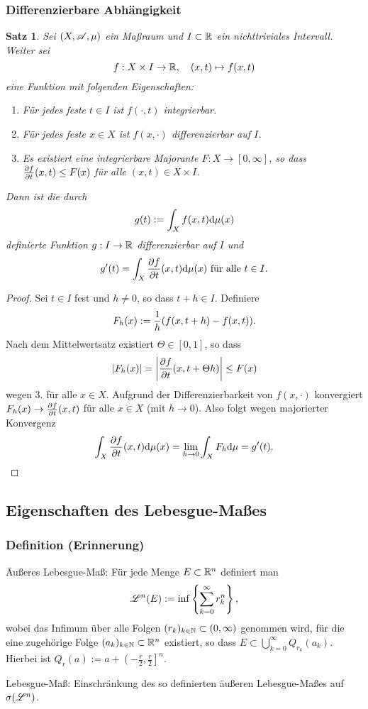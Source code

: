 \documentclass[
 a4paper,
 12pt,
 parskip=half
 ]{scrartcl}
\theoremstyle{plain}
\newtheorem*{thm*}{Satz}
\theoremstyle{definition}
\numberwithin{equation}{section}
\begin{document}
\subsubsection{Differenzierbare Abhängigkeit}
\begin{thm*}
 Sei $(X, \mathscr{A}, \mu)$ ein Maßraum und $I \subset \mathbb{R}$ ein nichttriviales Intervall. Weiter sei 
 \[ f: X \times I \to \mathbb{R}, \quad (x,t) \mapsto f(x,t) \]
 eine Funktion mit folgenden Eigenschaften:
 \begin{enumerate}
  \item Für jedes feste $t \in I$ ist $f( \cdot, t )$ integrierbar.
  \item Für jedes feste $x \in X$ ist $f( x, \cdot )$ differenzierbar auf $I$.
  \item Es existiert eine integrierbare Majorante $F: X \to [0,\infty]$, so dass $\frac{\partial f}{\partial t}(x,t) \le F(x)$ für alle $(x,t) \in X \times I$.
 \end{enumerate}
 Dann ist die durch
 \[ g(t) := \int_X f(x,t) \mathrm{d} \mu(x)  \]
 definierte Funktion $g: I \to \mathbb{R}$ differenzierbar auf $I$ und
 \[ g'(t) = \int_X \frac{\partial f}{\partial t}(x,t) \mathrm{d} \mu(x) \text{ für alle } t \in I. \]
\end{thm*}

\begin{proof}
 Sei $t \in I$ fest und $h \ne 0$, so dass $t+h \in I$. Definiere
 \[ F_h(x) := \frac{1}{h}( f(x, t+h) - f(x,t) ). \]
 Nach dem Mittelwertsatz existiert $\Theta \in [0,1]$, so dass
 \[ |F_h(x)| = \left| \frac{\partial f}{\partial t} (x, t + \Theta h) \right| \le F(x) \]
 wegen 3. für alle $x \in X$. Aufgrund der Differenzierbarkeit von $f(x, \cdot)$ konvergiert $F_h(x) \to \frac{\partial f}{\partial t}(x,t)$ für alle $x \in X$ (mit $h \to 0$). Also folgt wegen majorierter Konvergenz
 \[ \int_X \frac{\partial f}{\partial t}(x,t) \mathrm{d} \mu(x) = \lim_{h \to 0} \int_X F_h \mathrm{d} \mu = g'(t). \]
\end{proof}

\subsection{Eigenschaften des Lebesgue-Maßes}
\subsubsection{Definition (Erinnerung)}
 Äußeres Lebesgue-Maß: Für jede Menge $E \subset \mathbb{R}^n$ definiert man
 \[ \mathscr{L}^n( E ) := \inf \left\{ \sum_{k=0}^\infty r_k^n \right\}, \]
 wobei das Infimum über alle Folgen $(r_k)_{k \in \mathbb{N}} \subset (0, \infty)$ genommen wird, für die eine zugehörige Folge $(a_k)_{k \in \mathbb{N}} \subset \mathbb{R}^n$ existiert, so dass $E \subset \bigcup_{k=0}^\infty Q_{r_k}(a_k)$. Hierbei ist $Q_{r}(a) := a + \left(-\frac{r}{2}, \frac{r}{2} \right]^n$.

 Lebesgue-Maß: Einschränkung des so definierten äußeren Lebesgue-Maßes auf $\sigma( \mathscr{L}^n )$.
\end{document}
